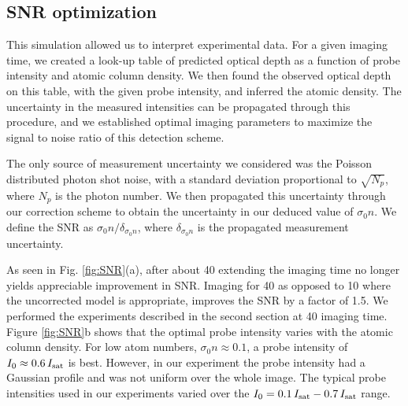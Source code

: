 \documentclass[12pt]{iopart}
\begin{document}
\subsection{SNR optimization}
This simulation allowed us to interpret experimental data. For a given imaging time, we created a look-up table of predicted optical depth as a function of probe intensity and atomic column density. We then found the observed optical depth on this table, with the given probe intensity, and inferred the atomic density. The uncertainty in the measured intensities can be propagated through this procedure, and we established optimal imaging parameters to maximize the signal to noise ratio of this detection scheme.
\par The only source of measurement uncertainty we considered was the Poisson distributed photon shot noise, with a standard deviation proportional to $\sqrt{N_p}$, where $N_p$ is the photon number. We then propagated this uncertainty through our correction scheme to obtain the uncertainty in our deduced value of $\sigma_0 n$. We define the SNR as $\sigma_0 n/\delta_{\sigma_0 n}$, where $ \delta_{\sigma_0 n}$ is the propagated measurement uncertainty.
\par As seen in Fig. \ref{fig:SNR}(a), after about 40 \us{} extending the imaging time no longer yields appreciable improvement in SNR. Imaging for 40 \us{} as opposed to 10 \us{} where the uncorrected model is appropriate, improves the SNR by a factor of  1.5. We performed the experiments described in the second section at 40 \us{} imaging time. Figure \ref{fig:SNR}b shows that the optimal probe intensity varies with the atomic column density. For low atom numbers, $\sigma_0 n\approx0.1$, a probe intensity of $I_0\approx0.6\,I_{\rm{sat}}$ is best. However, in our experiment the probe intensity had a Gaussian profile and was not uniform over the whole image.  The typical probe intensities used in our experiments varied over the $I_0=0.1\,I_{\rm{sat}}-0.7\,I_{\rm{sat}}$  range.
\end{document}
